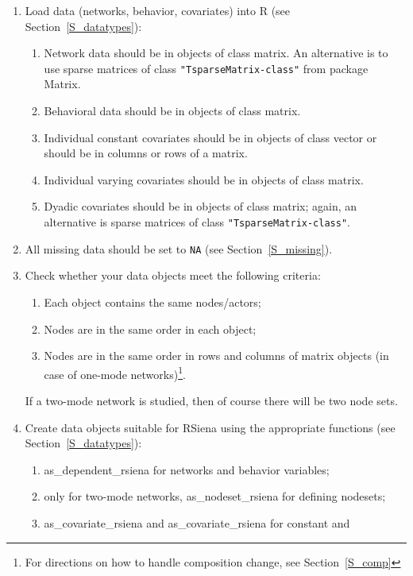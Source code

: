 \documentclass[a4paper,fleqn,11pt]{article}
\newcommand{\+}{\, + \,}
\newcommand{\sfn}[1]{\textsf{#1}}
\newcommand{\R}{{\sf R }}
\newcommand{\RS}{{\sf \textsf{RSiena} }}
\begin{document}
   \begin{enumerate}
	\item	Load data (networks, behavior, covariates) into \R
            (see Section~\ref{S_datatypes}):
	\begin{enumerate}
		\item Network data should be in objects of class matrix.
            An alternative is to use sparse matrices of class
             \texttt{"TsparseMatrix-class"}  from package { \sf Matrix}.
		\item	Behavioral data should be in objects of class matrix.
		\item	Individual constant covariates should be in objects of
            class vector or should be in columns or rows of a matrix.
		\item	Individual varying covariates should be in objects of class matrix.
		\item	Dyadic covariates should be in objects of class matrix;
        again, an alternative is sparse matrices of class
             \texttt{"TsparseMatrix-class"}.
	\end{enumerate}
	\item	All missing data should be set to \texttt{NA} (see Section~\ref{S_missing}).
	\item Check whether your data objects meet the following criteria:
	\begin{enumerate}
		\item	Each object contains the same nodes/actors;
		\item	Nodes are in the same order in each object;
		\item	Nodes are in the same order in rows and columns of matrix
                objects (in case of one-mode networks)\footnote{For
		directions on how to handle composition change, see Section~\ref{S_comp}}.
	\end{enumerate}
   If a two-mode network is studied, then of course there will
   be two node sets.
	\item	Create data objects suitable for \RS using the appropriate
                functions (see Section~\ref{S_datatypes}):
	\begin{enumerate}
		\item	\sfn{as\_dependent\_rsiena} for networks and behavior variables;
		\item	only for two-mode networks, \sfn{as\_nodeset\_rsiena} for defining nodesets;
		\item	\sfn{as\_covariate\_rsiena} and \sfn{as\_covariate\_rsiena} for constant and

\end{enumerate}
\end{enumerate}
\end{document}
